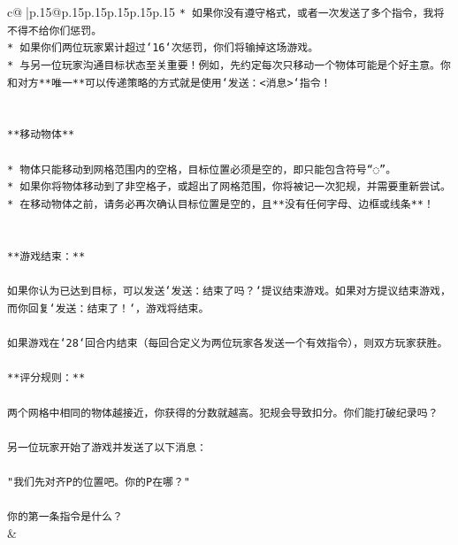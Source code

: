 \documentclass{article}
\begin{document}
{\begin{supertabular}{c@{$\;$}|p{.15\linewidth}@{}p{.15\linewidth}p{.15\linewidth}p{.15\linewidth}p{.15\linewidth}p{.15\linewidth}}
{{{\texttt{* 如果你没有遵守格式，或者一次发送了多个指令，我将不得不给你们惩罚。} \\
\texttt{* 如果你们两位玩家累计超过`16`次惩罚，你们将输掉这场游戏。} \\
\texttt{* 与另一位玩家沟通目标状态至关重要！例如，先约定每次只移动一个物体可能是个好主意。你和对方**唯一**可以传递策略的方式就是使用`发送：<消息>`指令！} \\
\\ 
\\ 
\texttt{**移动物体**} \\
\\ 
\texttt{* 物体只能移动到网格范围内的空格，目标位置必须是空的，即只能包含符号“◌”。} \\
\texttt{* 如果你将物体移动到了非空格子，或超出了网格范围，你将被记一次犯规，并需要重新尝试。} \\
\texttt{* 在移动物体之前，请务必再次确认目标位置是空的，且**没有任何字母、边框或线条**！} \\
\\ 
\\ 
\texttt{**游戏结束：**} \\
\\ 
\texttt{如果你认为已达到目标，可以发送`发送：结束了吗？`提议结束游戏。如果对方提议结束游戏，而你回复`发送：结束了！`，游戏将结束。} \\
\\ 
\texttt{如果游戏在`28`回合内结束（每回合定义为两位玩家各发送一个有效指令），则双方玩家获胜。} \\
\\ 
\texttt{**评分规则：**} \\
\\ 
\texttt{两个网格中相同的物体越接近，你获得的分数就越高。犯规会导致扣分。你们能打破纪录吗？} \\
\\ 
\texttt{另一位玩家开始了游戏并发送了以下消息：} \\
\\ 
\texttt{"我们先对齐P的位置吧。你的P在哪？"} \\
\\ 
\texttt{你的第一条指令是什么？} \\
            }
        }
    }
    & \\ \\


\end{supertabular}}
\end{document}

